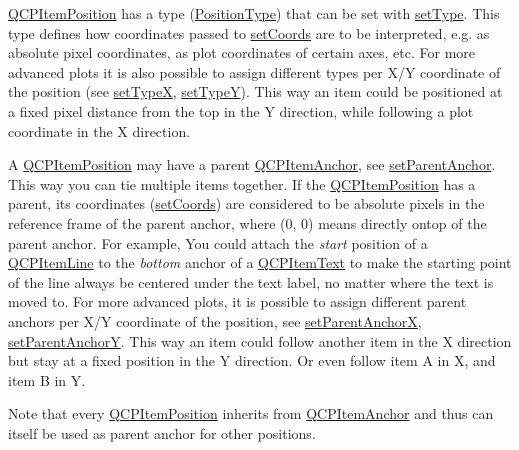 \hyperlink{class_q_c_p_item_position}{Q\+C\+P\+Item\+Position} has a type (\hyperlink{class_q_c_p_item_position_aad9936c22bf43e3d358552f6e86dbdc8}{Position\+Type}) that can be set with \hyperlink{class_q_c_p_item_position_aa476abf71ed8fa4c537457ebb1a754ad}{set\+Type}. This type defines how coordinates passed to \hyperlink{class_q_c_p_item_position_aa988ba4e87ab684c9021017dcaba945f}{set\+Coords} are to be interpreted, e.\+g. as absolute pixel coordinates, as plot coordinates of certain axes, etc. For more advanced plots it is also possible to assign different types per X/Y coordinate of the position (see \hyperlink{class_q_c_p_item_position_a2113b2351d6d00457fb3559a4e20c3ea}{set\+TypeX}, \hyperlink{class_q_c_p_item_position_ac2a454aa5a54c1615c50686601ec4510}{set\+TypeY}). This way an item could be positioned at a fixed pixel distance from the top in the Y direction, while following a plot coordinate in the X direction.

A \hyperlink{class_q_c_p_item_position}{Q\+C\+P\+Item\+Position} may have a parent \hyperlink{class_q_c_p_item_anchor}{Q\+C\+P\+Item\+Anchor}, see \hyperlink{class_q_c_p_item_position_ac094d67a95d2dceafa0d50b9db3a7e51}{set\+Parent\+Anchor}. This way you can tie multiple items together. If the \hyperlink{class_q_c_p_item_position}{Q\+C\+P\+Item\+Position} has a parent, its coordinates (\hyperlink{class_q_c_p_item_position_aa988ba4e87ab684c9021017dcaba945f}{set\+Coords}) are considered to be absolute pixels in the reference frame of the parent anchor, where (0, 0) means directly ontop of the parent anchor. For example, You could attach the {\itshape start} position of a \hyperlink{class_q_c_p_item_line}{Q\+C\+P\+Item\+Line} to the {\itshape bottom} anchor of a \hyperlink{class_q_c_p_item_text}{Q\+C\+P\+Item\+Text} to make the starting point of the line always be centered under the text label, no matter where the text is moved to. For more advanced plots, it is possible to assign different parent anchors per X/Y coordinate of the position, see \hyperlink{class_q_c_p_item_position_add71461a973927c74e42179480916d9c}{set\+Parent\+AnchorX}, \hyperlink{class_q_c_p_item_position_add5ec1db9d19cec58a3b5c9e0a0c3f9d}{set\+Parent\+AnchorY}. This way an item could follow another item in the X direction but stay at a fixed position in the Y direction. Or even follow item A in X, and item B in Y.

Note that every \hyperlink{class_q_c_p_item_position}{Q\+C\+P\+Item\+Position} inherits from \hyperlink{class_q_c_p_item_anchor}{Q\+C\+P\+Item\+Anchor} and thus can itself be used as parent anchor for other positions.

